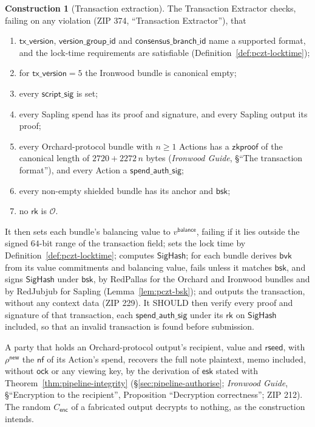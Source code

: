 \documentclass[11pt,a4paper]{article}
\theoremstyle{definition}
\newtheorem{construction}[theorem]{Construction}
\newcommand{\nfsym}{\mathsf{nf}}
\newcommand{\rk}{\mathsf{rk}}
\begin{document}
\begin{construction}[Transaction extraction]\label{def:pczt-extract}
The Transaction Extractor checks, failing on any violation (ZIP 374,
``Transaction Extractor''), that
\begin{enumerate}[label=(\roman*)]
\item $\mathsf{tx\_version}$, $\mathsf{version\_group\_id}$ and
  $\mathsf{consensus\_branch\_id}$ name a supported format, and the
  lock-time requirements are satisfiable
  (Definition~\ref{def:pczt-locktime});
\item for $\mathsf{tx\_version} = 5$ the Ironwood bundle is canonical empty;
\item every $\mathsf{script\_sig}$ is set;
\item every Sapling spend has its proof and signature, and every Sapling
  output its proof;
\item every Orchard-protocol bundle with $n \ge 1$ Actions has a
  $\mathsf{zkproof}$ of the canonical length of $2720 + 2272\,n$ bytes
  (\emph{Ironwood Guide}, \S``The transaction format''), and every Action a
  $\mathsf{spend\_auth\_sig}$;
\item every non-empty shielded bundle has its anchor and $\mathsf{bsk}$;
\item no $\rk$ is $\mathcal{O}$.
\end{enumerate}
It then sets each bundle's balancing value to $v^{\mathsf{balance}}$,
failing if it lies outside the signed $64$-bit range of the transaction
field; sets the lock time by Definition~\ref{def:pczt-locktime}; computes
$\mathsf{SigHash}$; for each bundle derives $\mathsf{bvk}$ from its value
commitments and balancing value, fails unless it matches $\mathsf{bsk}$,
and signs $\mathsf{SigHash}$ under $\mathsf{bsk}$, by RedPallas for the
Orchard and Ironwood bundles and by RedJubjub for Sapling
(Lemma~\ref{lem:pczt-bsk}); and outputs the transaction, without any
context data (ZIP 229). It SHOULD then verify every proof and signature of
that transaction, each $\mathsf{spend\_auth\_sig}$ under its $\rk$ on
$\mathsf{SigHash}$ included, so that an invalid transaction is found before
submission.
\end{construction}

A party that holds an Orchard-protocol output's recipient, value and
$\mathsf{rseed}$, with $\rho^{\mathsf{new}}$ the $\nfsym$ of its Action's
spend, recovers the full note plaintext, memo included, without
$\mathsf{ock}$ or any viewing key, by the derivation of $\mathsf{esk}$
stated with Theorem~\ref{thm:pipeline-integrity}
(\S\ref{sec:pipeline-authorise};
\emph{Ironwood Guide}, \S``Encryption to the recipient'', Proposition
``Decryption correctness''; ZIP 212). The random $C_{\mathsf{enc}}$ of a
fabricated output decrypts to nothing, as the construction intends.
\end{document}
